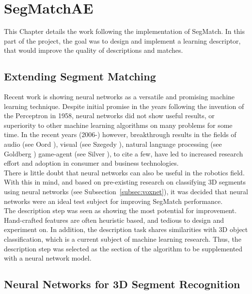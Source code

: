 \chapter{SegMatchAE}
\label{chap:ae}

This Chapter details the work following the implementation of SegMatch. In this part of the project, the goal was to design and implement a learning descriptor, that would improve the quality of descriptions and matches.\\

\section{Extending Segment Matching}
\label{sec:ae-intro}

Recent work is showing neural networks as a versatile and promising machine learning technique. Despite initial promise in the years following the invention of the Perceptron \cite{perceptron} in 1958, neural networks did not show useful results, or superiority to other machine learning algorithms on many problems for some time. In the recent years (2006-) however, breakthrough results in the fields of audio (see Oord \cite{wavenet}), visual (see Szegedy \cite{inception}), natural language processing (see Goldberg \cite{nlp}) game-agent (see Silver \cite{alphago}), to cite a few, have led to increased research effort and adoption in consumer and business technologies.\\

There is little doubt that neural networks can also be useful in the robotics field. With this in mind, and based on pre-existing research on classifying 3D segments using neural networks (see Subsection~\ref{subsec:voxnet}), it was decided that neural networks were an ideal test subject for improving SegMatch performance.\\

The description step was seen as showing the most potential for improvement. Hand-crafted features are often heuristic based, and tedious to design and experiment on. In addition, the description task shares similarities with 3D object classification, which is a current subject of machine learning research. Thus, the description step was selected as the section of the algorithm to be supplemented with a neural network model.\\

\section{Neural Networks for 3D Segment Recognition}
\label{sec:neural-nets}

